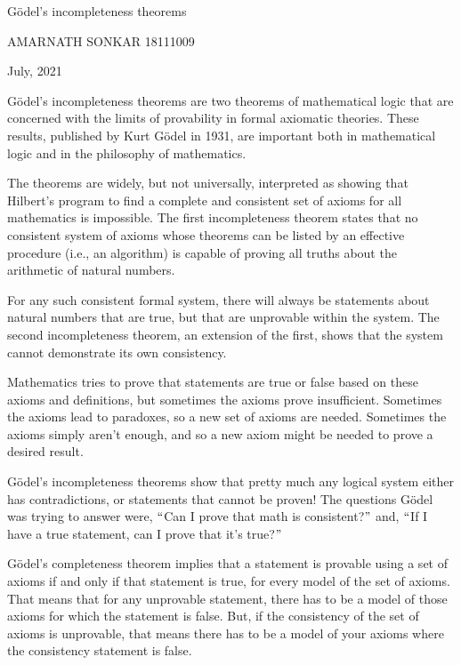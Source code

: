 \documentclass[11pt]{article}
\begin{document}
\begin{center}
{\huge Gödel's incompleteness theorems}
\end{center}


\begin{center}
{\large AMARNATH SONKAR 18111009}
\end{center}


\begin{center}
{\large July, 2021}
\end{center}


{\Large Gödel's incompleteness theorems are two theorems of mathematical logic that are concerned with the limits of provability in formal axiomatic theories. These results, published by Kurt Gödel in 1931, are important both in mathematical logic and in the philosophy of mathematics.\par}

{\Large  The theorems are widely, but not universally, interpreted as showing that Hilbert's program to find a complete and consistent set of axioms for all mathematics is impossible. The first incompleteness theorem states that no consistent system of axioms whose theorems can be listed by an effective procedure (i.e., an algorithm) is capable of proving all truths about the arithmetic of natural numbers.\par}

{\Large  For any such consistent formal system, there will always be statements about natural numbers that are true, but that are unprovable within the system. The second incompleteness theorem, an extension of the first, shows that the system cannot demonstrate its own consistency. \par}

{\Large Mathematics tries to prove that statements are true or false based on these axioms and definitions, but sometimes the axioms prove insufficient. Sometimes the axioms lead to paradoxes, so a new set of axioms are needed. Sometimes the axioms simply aren’t enough, and so a new axiom might be needed to prove a desired result.\par}

{\Large  Gödel’s incompleteness theorems show that pretty much any logical system either has contradictions, or statements that cannot be proven! The questions Gödel was trying to answer were, $``$Can I prove that math is consistent?$"$ and, $``$If I have a true statement, can I prove that it’s true?$"$\par}

{\Large Gödel’s completeness theorem implies that a statement is provable using a set of axioms if and only if that statement is true, for every model of the set of axioms. That means that for any unprovable statement, there has to be a model of those axioms for which the statement is false. But, if the consistency of the set of axioms is unprovable, that means there has to be a model of your axioms where the consistency statement is false.\par}
\end{document}
